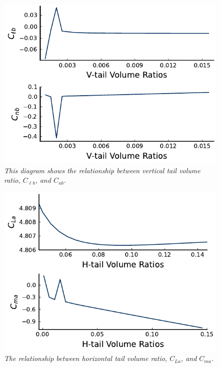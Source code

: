 \documentclass[journal]{new-aiaa}
\begin{document}
	\begin{figure}[H]
		\centering
		\includegraphics[scale=0.73]{../graphics/vtail-stability.pdf}
		\caption{\emph{This diagram shows the relationship between vertical tail volume ratio, \(C_{\ell{b}}\), and \(C_{nb}\).}}
		\label{fig:vtail-stability}
	\end{figure}
	
	\begin{figure}[H]
		\centering
		\includegraphics[scale=0.73]{../graphics/htail-stability.pdf}
		\caption{\emph{The relationship between horizontal tail volume ratio, \(C_{La}\), and \(C_{ma}\).}}
		\label{fig:htail-stability}
	\end{figure}
	
\end{document}
